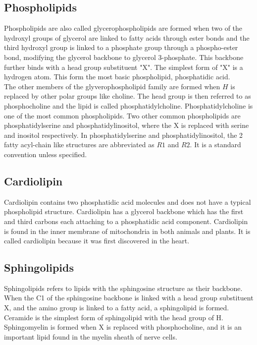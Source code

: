 \documentclass[11pt]{article}
\begin{document}
\subsection{Phospholipids}
\label{sec:org1d23b75}
Phospholipids are also called glycerophospholipids are formed when two of the hydroxyl groups of glycerol are linked to fatty acids through ester bonds and the third hydroxyl group is linked to a phosphate group through a phospho-ester bond, modifying the glycerol backbone to glycerol 3-phosphate. This backbone further binds with a head group substituent "X". The simplest form of "X" is a hydrogen atom. This form the most basic phospholipid, phosphatidic acid.
\\[0pt]

The other members of the glyverophospholipid family are formed when \(H\) is replaced by other polar groups like choline. The head group is then referred to as phosphocholine and the lipid is called phosphatidylcholine. Phosphatidylcholine is one of the most common phospholipids. Two other common phospholipids are phosphatidylserine and phosphatidylinositol, where the X is replaced with serine and inositol respectively. In phosphatidylserine and phosphatidylinositol, the 2 fatty acyl-chain like structures are abbreviated as \(R1\) and \(R2\). It is a standard convention unless specified.

\subsection{Cardiolipin}
\label{sec:org762bc6d}
Cardiolipin contains two phosphatidic acid molecules and does not have a typical phospholipid structure. Cardiolipin has a glycerol backbone which has the first and third carbons each attaching to a phosphatidic acid component. Cardiolipin is found in the inner membrane of mitochondria in both animals and plants. It is called cardiolipin because it was first discovered in the heart.

\subsection{Sphingolipids}
\label{sec:org4a9cc7f}
Sphingolipids refers to lipids with the sphingosine structure as their backbone. When the C1 of the sphingosine backbone is linked with a head group substituent X, and the amino group is linked to a fatty acid, a sphingolipid is formed. Ceramide is the simplest form of sphingolipid with the head group of H. Sphingomyelin is formed when X is replaced with phosphocholine, and it is an important lipid found in the myelin sheath of nerve cells.
\end{document}
